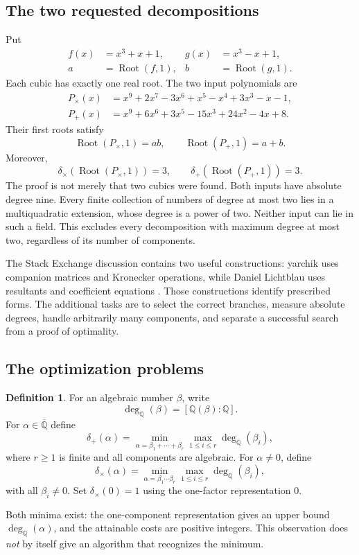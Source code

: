\documentclass[11pt,letterpaper]{article}
\theoremstyle{definition}
\newtheorem{definition}[theorem]{Definition}
\newcommand{\Q}{\mathbb Q}
\newcommand{\dq}{\deg_{\Q}}
\newcommand{\dplus}{\delta_{+}}
\newcommand{\dtimes}{\delta_{\times}}
\begin{document}
\subsection{The two requested decompositions}
Put
\begin{align}
 f(x)&=x^3+x+1,& g(x)&=x^3-x+1,\\
 a&=\operatorname{Root}(f,1),& b&=\operatorname{Root}(g,1).
\end{align}
Each cubic has exactly one real root. The two input polynomials are
\begin{align}
 P_{\times}(x)&=x^9+2x^7-3x^6+x^5-x^4+3x^3-x-1,\\
 P_{+}(x)&=x^9+6x^6+3x^5-15x^3+24x^2-4x+8.
\end{align}
Their first roots satisfy
\begin{equation}\label{eq:mainanswers}
 \boxed{\operatorname{Root}(P_{\times},1)=ab,\qquad
 \operatorname{Root}(P_{+},1)=a+b.}
\end{equation}
Moreover,
\begin{equation}\label{eq:mainoptimal}
 \boxed{\dtimes(\operatorname{Root}(P_{\times},1))=3,\qquad
 \dplus(\operatorname{Root}(P_{+},1))=3.}
\end{equation}
The proof is not merely that two cubics were found. Both inputs have absolute degree nine. Every finite collection of numbers of degree at most two lies in a multiquadratic extension, whose degree is a power of two. Neither input can lie in such a field. This excludes every decomposition with maximum degree at most two, regardless of its number of components.

The Stack Exchange discussion contains two useful constructions: yarchik uses companion matrices and Kronecker operations, while Daniel Lichtblau uses resultants and coefficient equations \cite{mse}. Those constructions identify prescribed forms. The additional tasks are to select the correct branches, measure absolute degrees, handle arbitrarily many components, and separate a successful search from a proof of optimality.

\subsection{The optimization problems}
\begin{definition}
For an algebraic number $\beta$, write
\[
 \dq(\beta)=[\Q(\beta):\Q].
\]
For $\alpha\in\overline{\Q}$ define
\[
 \dplus(\alpha)=\min_{\alpha=\beta_1+\cdots+\beta_r}
       \max_{1\leq i\leq r}\dq(\beta_i),
\]
where $r\geq1$ is finite and all components are algebraic. For $\alpha\ne0$, define
\[
 \dtimes(\alpha)=\min_{\alpha=\beta_1\cdots\beta_r}
       \max_{1\leq i\leq r}\dq(\beta_i),
\]
with all $\beta_i\ne0$. Set $\dtimes(0)=1$ using the one-factor representation $0$.
\end{definition}
Both minima exist: the one-component representation gives an upper bound $\dq(\alpha)$, and the attainable costs are positive integers. This observation does \emph{not} by itself give an algorithm that recognizes the minimum.
\end{document}

